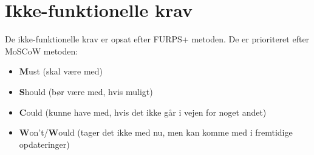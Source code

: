 \newpage 
\newpage 
\newpage
\newpage



\section{Ikke-funktionelle krav}
De ikke-funktionelle krav er opsat efter FURPS+ metoden. De er prioriteret efter MoSCoW metoden:
\begin{itemize}
\item \textbf{M}ust (skal være med)
\item \textbf{S}hould (bør være med, hvis muligt)
\item \textbf{C}ould (kunne have med, hvis det ikke går i vejen for noget andet)
\item \textbf{W}on't/\textbf{W}ould (tager det ikke med nu, men kan komme med i fremtidige opdateringer)
\end{itemize}

